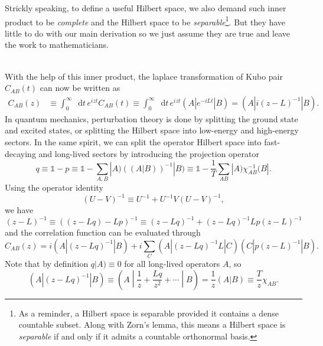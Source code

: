 \documentclass[10pt,nofootinbib,letterpaper]{revtex4}
\newcommand*\dd{\mathop{}\!\mathrm{d}}
\newcounter{Note}[section]
\newenvironment{Note}[1][]{{\par\normalfont\bfseries \underline{Note~\stepcounter{Note}\arabic{Note}.}~#1~~}}{\par}
\begin{document}
			\begin{Note}
				Strickly speaking, to define a useful Hilbert space, we also demand such inner product to be \emph{complete} and the Hilbert space to be \emph{separable}\footnote{As a reminder, a Hilbert space is separable provided it contains a dense countable subset. Along with Zorn's lemma, this means a Hilbert space is \emph{separable} if and only if it admits a countable orthonormal basis.}. But they have little to do with our main derivation so we just assume they are true and leave the work to mathematicians. 
			\end{Note}
			\hfill\\
			With the help of this inner product, the laplace transformation of Kubo pair $C_{AB}(t)$ can now be written as
			\begin{align*}
				C_{AB}(z)&\equiv\int_0^\infty\dd t\, e^{izt}C_{AB}(t)\equiv\int_0^\infty\dd t\, e^{izt}(A|e^{-iLt}|B)=(A|i(z-L)^{-1}|B).
			\end{align*}
			\indent In quantum mechanics, perturbation theory is done by splitting the ground state and excited states, or splitting the Hilbert space into low-energy and high-energy sectors. In the same spirit, we can split the operator Hilbert space into fast-decaying and long-lived sectors by introducing the projection operator
			\begin{equation*}
				q\equiv\mathds{1}-p\equiv\mathds{1}-\sum_{A,B}|A)\left((A|B)\right)^{-1}|B)\equiv\mathds{1}-\dfrac{1}{T}\sum_{AB}|A)\chi_{AB}^{-1}(B|.
			\end{equation*}
			Using the operator identity
			\begin{equation}\label{1.2.3}
				(U-V)^{-1}\equiv U^{-1}+U^{-1}V(U-V)^{-1},
			\end{equation}
			we have
			\begin{equation*}
				(z-L)^{-1}\equiv((z-Lq)-Lp)^{-1}\equiv(z-Lq)^{-1}+(z-Lq)^{-1}Lp(z-L)^{-1}
			\end{equation*}
			and the correlation function can be evaluated through
			\begin{equation*}
				C_{AB}(z)=i(A|(z-Lq)^{-1}|B)+i\sum_C(A|(z-Lq)^{-1}L|C)(C|p(z-L)^{-1}|B).
			\end{equation*}
			Note that by definition $q|A)\equiv 0$ for all long-lived operators $A$, so
			\begin{equation*}
				(A|(z-Lq)^{-1}|B)\equiv \left(A\middle|\dfrac{1}{z}+\dfrac{Lq}{z^2}+\cdots\middle| B\right)=\dfrac{1}{z}(A|B)\equiv\dfrac{T}{z}\chi_{AB}. 
			\end{equation*}
\end{document}
